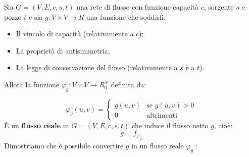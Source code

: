 Sia $G = (V, E, c, s, t)$ una rete di flusso con funzione capacità $c$, sorgente $s$ e pozzo $t$ e sia $g : V \times V \to R$ una funzione che soddisfi:

\begin{itemize}
    \item Il vincolo di capacità (relativamente a $c$);
    \item La proprietà di antisimmetria;
    \item La legge di conservazione del flusso (relativamente a $s$ e a $t$).
\end{itemize}

Allora la funzione $\varphi_g : V \times V \to R^+_0$ definita da:

\[\varphi_g(u, v) = 
\begin{cases} 
    g(u, v) & \text{se } g(u, v) > 0 \\
    0 & \text{altrimenti}
\end{cases}
\]
È un \textbf{flusso reale} in $G = (V, E, c, s, t)$ che induce il flusso netto $g$, cioè:
\[g = f_{\varphi_g}\]
Dimostriamo che è possibile convertire $g$ in un flusso reale $\varphi_g$ :
